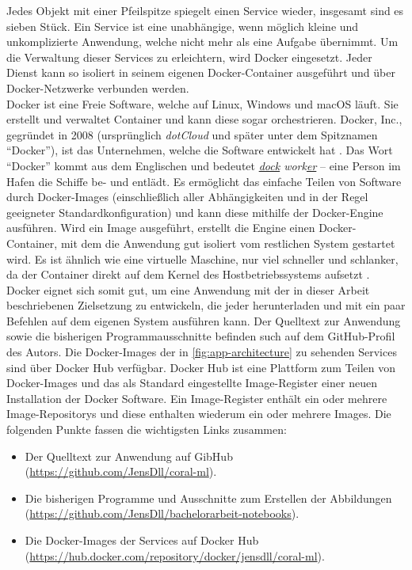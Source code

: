 \noindent
Jedes Objekt mit einer Pfeilspitze spiegelt einen Service wieder, insgesamt sind
es sieben Stück. Ein Service ist eine unabhängige, wenn möglich kleine und
unkomplizierte Anwendung, welche nicht mehr als eine Aufgabe übernimmt.
Um die Verwaltung dieser Services zu erleichtern, wird Docker eingesetzt.
Jeder Dienst kann so isoliert in seinem eigenen Docker-Container ausgeführt
und über Docker-Netzwerke verbunden werden.\\[8pt]
Docker ist eine Freie Software, welche auf Linux, Windows und macOS
läuft. Sie erstellt und verwaltet Container
und kann diese sogar orchestrieren.
Docker, Inc., gegründet in 2008 (ursprünglich \textit{dotCloud} und später unter
dem Spitznamen \enquote{Docker}), ist das Unternehmen,
welche die Software entwickelt hat \parencite{onlide:docker-inc}.
Das Wort \enquote{Docker} kommt aus dem Englischen
und bedeutet \textit{\underline{dock} work\underline{er}} --
eine Person im Hafen die Schiffe be- und entlädt.
Es ermöglicht das einfache Teilen von Software
durch Docker-Images (einschließlich aller Abhängigkeiten
und in der Regel geeigneter Standardkonfiguration) und kann
diese mithilfe der Docker-Engine ausführen.
Wird ein Image ausgeführt, erstellt die Engine einen Docker-Container,
mit dem die Anwendung gut isoliert vom restlichen System gestartet wird.
Es ist ähnlich wie eine virtuelle Maschine,
nur viel schneller und schlanker, 
da der Container direkt auf dem Kernel des Hostbetriebssystems aufsetzt
\parencite[11-14]{book:docker-dd} \parencite[672]{book:hands-on-ml}.\\[8pt]
Docker eignet sich somit gut, um eine Anwendung mit der in dieser Arbeit beschriebenen
Zielsetzung zu entwickeln, die jeder herunterladen und mit ein paar Befehlen
auf dem eigenen System ausführen kann. Der Quelltext zur Anwendung
sowie die bisherigen Programmausschnitte
befinden such auf dem GitHub-Profil des Autors.
Die Docker-Images der in \autoref{fig:app-architecture} zu sehenden
Services sind über Docker Hub verfügbar.
Docker Hub ist eine Plattform zum Teilen von Docker-Images und das als Standard
eingestellte Image-Register einer neuen Installation der Docker Software.
Ein Image-Register enthält ein oder mehrere Image-Repositorys
und diese enthalten wiederum ein oder mehrere Images.
Die folgenden Punkte fassen die wichtigsten Links zusammen:
\begin{itemize}
  \item Der Quelltext zur Anwendung auf GibHub
        (\url{https://github.com/JensDll/coral-ml}).
  \item Die bisherigen Programme und Ausschnitte zum Erstellen der Abbildungen
        (\url{https://github.com/JensDll/bachelorarbeit-notebooks}).
  \item Die Docker-Images der Services auf Docker Hub
        (\href{https://hub.docker.com/repository/docker/jensdll/coral-ml}
        {https://hub.docker.com/reposito\allowbreak ry/docker/jensdll/coral-ml}).
\end{itemize}

